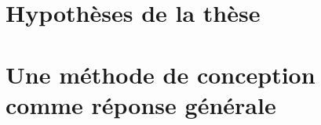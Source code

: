 \documentclass[ twoside,openright,titlepage,numbers=noenddot,headinclude,%
                footinclude=true,cleardoublepage=empty,abstractoff, %
                BCOR=5mm,paper=a4,fontsize=11pt,%
                french,american,%
                ]{scrreprt}
\begin{document}
\section{Hypothèses de la thèse}

\section{Une méthode de conception comme réponse générale}
\end{document}
